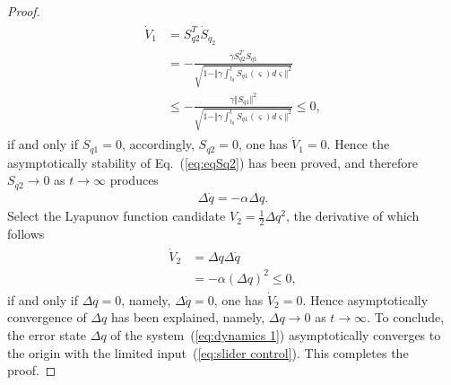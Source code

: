 \documentclass[Journal,letterpaper]{ascelike-new}
\theoremstyle{plain}
\theoremstyle{remark}
\begin{document}
\begin{proof}
\begin{align}
\begin{split}
\dot V_1 &= S_{q2}^T\dot S_{q_2}\\
&=-\frac{\gamma S_{q2}^TS_{q1}}{\sqrt{1-\Vert\gamma\int^t_{t_0}S_{q1}(\varsigma) d\varsigma\Vert^2}}\\
&\le -\frac{\gamma \Vert S_{q1}\Vert^2}{\sqrt{1-\Vert\gamma\int^t_{t_0}S_{q1}(\varsigma) d\varsigma\Vert^2}}\le 0,
\end{split}
\end{align}
if and only if $S_{q1} = 0$, accordingly, $S_{q2} = 0$, one has $\dot V_1=0$. Hence the asymptotically stability of Eq.~(\ref{eq:eqSq2}) has been proved, and therefore $S_{q2}\rightarrow 0$ as $t\rightarrow \infty$ produces
\begin{align}
\Delta \dot q=-\alpha \Delta q.
\end{align}
Select the Lyapunov function candidate $V_2=\frac{1}{2}\Delta q^2$, the derivative of which follows
\begin{align}
\begin{split}
\dot V_2 &= \Delta q\Delta \dot q\\
&=-\alpha (\Delta q)^2\le 0,
\end{split}
\end{align}
if and only if $\Delta q = 0$, namely, $\Delta \dot q = 0$, one has $\dot V_2=0$. Hence asymptotically convergence of $\Delta q$ has been explained, namely, $\Delta q\rightarrow 0$ as $t\rightarrow \infty$. To conclude, the error state $\Delta q$ of the system~(\ref{eq:dynamics 1}) asymptotically converges to the origin with the limited input~(\ref{eq:slider control}). This completes the proof.
\end{proof}
\end{document}
